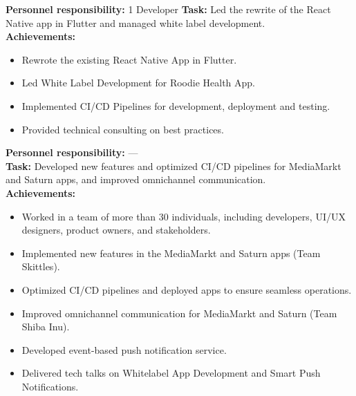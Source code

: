 \documentclass[10pt,a4paper,normalphoto]{altacv}
\begin{document}
\newpage
\begin{fullwidth}
    
\textbf{Personnel responsibility:} 1 Developer 
\textbf{Task:} Led the rewrite of the React Native app in Flutter and managed white label development.\\
\textbf{Achievements:}
\begin{itemize}
    \item Rewrote the existing React Native App in Flutter.
    \item Led White Label Development for Roodie Health App.
    \item Implemented CI/CD Pipelines for development, deployment and testing.
    \item Provided technical consulting on best practices.
\end{itemize}

\vspace{1em}


\vspace{2em}
    
\textbf{Personnel responsibility:} —\\
\textbf{Task:} Developed new features and optimized CI/CD pipelines for MediaMarkt and Saturn apps, and improved omnichannel communication.\\
\textbf{Achievements:}
\begin{itemize}
    \item Worked in a team of more than 30 individuals, including developers, UI/UX designers, product owners, and stakeholders.
    \item Implemented new features in the MediaMarkt and Saturn apps (Team Skittles).
    \item Optimized CI/CD pipelines and deployed apps to ensure seamless operations.
    \item Improved omnichannel communication for MediaMarkt and Saturn (Team Shiba Inu).
    \item Developed event-based push notification service.
    \item Delivered tech talks on Whitelabel App Development and Smart Push Notifications.
\end{itemize}


\end{fullwidth}
\end{document}
